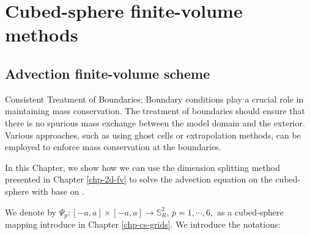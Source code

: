 \chapter{Cubed-sphere finite-volume methods}
\label{chp-cs-fv}

\section{Advection finite-volume scheme}

Consistent Treatment of Boundaries: Boundary conditions play a crucial role in maintaining mass conservation. 
The treatment of boundaries should ensure that there is no spurious mass exchange between the model domain and the exterior. 
Various approaches, such as using ghost cells or extrapolation methods, can be employed to enforce mass conservation at the boundaries.

In this Chapter, we show how we can use the dimension splitting method
presented in Chapter \ref{chp-2d-fv} to solve the advection
equation on the cubed-sphere with base on \citet{putman:2007}.

We denote by $\Psi_p:[-a,a] \times [-a,a] \to \mathbb{S}^2_R$,
$p=1, \cdots, 6,$ as a cubed-sphere mapping introduce in Chapter \ref{chp-cs-grids}.
We introduce the notations:

